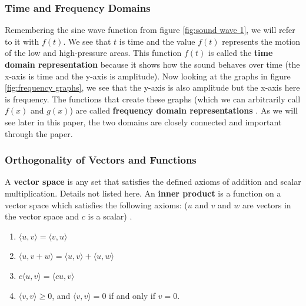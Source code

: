 \documentclass[10pt]{article}
\begin{document}



\vspace{7cm}





\subsubsection{Time and Frequency Domains}
\hspace{\parindent} Remembering the sine wave function from figure \ref{fig:sound wave 1}, we will refer to it with $f(t)$. We see that $t$ is time and the value $f(t)$ represents the motion of the low and high-pressure areas. This function $f(t)$ is called the \textbf{time domain representation} because it shows how the sound behaves over time (the x-axis is time and the y-axis is amplitude). Now looking at the graphs in figure \ref{fig:frequency graphs}, we see that the y-axis is also amplitude but the x-axis here is frequency. The functions that create these graphs (which we can arbitrarily call $f(x)$ and $g(x)$) are called \textbf{frequency domain representations} \cite{morrison1994fourier}. As we will see later in this paper, the two domains are closely connected and important through the paper.

\subsubsection{Orthogonality of Vectors and Functions}
\hspace{\parindent} A \textbf{vector space} is any set that satisfies the defined axioms of addition and scalar multiplication. Details not listed here. An \textbf{inner product} is a function on a vector space which satisfies the following axioms: ($u$ and $v$ and $w$ are vectors in the vector space and $c$ is a scalar) \cite{shields1968linearalgebra}.
\begin{enumerate}
    \item $\langle u, v \rangle = \langle v, u \rangle$
    \item $\langle u, v + w \rangle = \langle u, v \rangle + \langle u, w \rangle$
    \item $c \langle u, v \rangle = \langle cu, v \rangle$
    \item $\langle v, v \rangle \geq 0$, and $\langle v, v \rangle = 0$ if and only if $v = 0.$
\end{enumerate}
\end{document}
